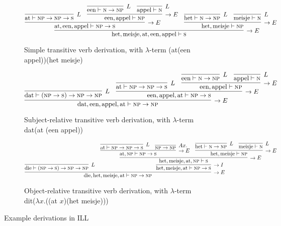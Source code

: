 \begin{figure}
	\begin{subfigure}[b]{1\textwidth}
	\centering
	\small
		\[
		\infer[\rightarrow E]{\text{het}, \text{meisje}, \text{at}, \text{een}, \text{appel} \vdash \textsc{s}}{
			\infer[\rightarrow E]{\text{at}, \text{een}, \text{appel} \vdash \textsc{np} \to \textsc{s}}{
				\infer[L]{\text{at} \vdash \textsc{np} \to \textsc{np} \to \textsc{s}}{}
				&
				\infer[\rightarrow E]{\text{een}, \text{appel} \vdash \textsc{np}}{
					\infer[L]{\text{een} \vdash \textsc{n} \to \textsc{np}}{}
					&
					\infer[L]{\text{appel} \vdash \textsc{n}}{}
				}
			}
			&		
			\infer[\rightarrow E]{\text{het}, \text{meisje} \vdash \textsc{np}}{
				\infer[L]{\text{het} \vdash \textsc{n} \to \textsc{np}}{}
				&
				\infer[L]{\text{meisje} \vdash \textsc{n}}{}
			}
		}
		\]
		\caption{Simple transitive verb derivation, with $\lambda$-term (at(een appel))(het meisje)}
		\end{subfigure}
		\begin{subfigure}[b]{1\textwidth}
		\centering
		\scriptsize
		\[
		\infer[\rightarrow E]{\text{dat}, \text{een}, \text{appel}, \text{at} \vdash \textsc{np} \to \textsc{np}}{
			\infer[L]{\text{dat} \vdash (\textsc{np} \to \textsc{s}) \to \textsc{np} \to \textsc{np}}{}
			&
			\infer[\rightarrow E]{\text{een}, \text{appel}, \text{at} \vdash \textsc{np} \to \textsc{s}}{
				\infer[L]{\text{at} \vdash \textsc{np} \to \textsc{np} \to \textsc{s}}{}
				&
				\infer[\rightarrow E]{\text{een}, \text{appel} \vdash \textsc{np}}{
					\infer[L]{\text{een} \vdash \textsc{n} \to \textsc{np}}{}
					&
					\infer[L]{\text{appel} \vdash \textsc{n}}{}
				}
			}
		}
		\]
		\caption{Subject-relative transitive verb derivation, with $\lambda$-term dat(at (een appel))}
		\label{subfig:ill_dutch:sub}
		\end{subfigure}
		\begin{subfigure}[b]{1\textwidth}
		\centering
		\scriptsize
		\[
		\infer[\rightarrow E]{\text{die}, \text{het}, \text{meisje}, \text{at} \vdash \textsc{np} \to \textsc{np}}{
			\infer[L]{\text{die} \vdash (\textsc{np} \to \textsc{s})\to \textsc{np} \to \textsc{np}}{}
			&
			\infer[\rightarrow I]{\text{het}, \text{meisje}, \text{at} \vdash \textsc{np} \to \textsc{s}}{
				\infer[\rightarrow E]{\text{het}, \text{meisje}, \text{at}, \textsc{np} \vdash \textsc{s}}{
					\infer[\rightarrow E]{\text{at}, \textsc{np}\vdash \textsc{np} \to \textsc{s}}{
						\infer[L]{\text{at} \vdash \textsc{np} \to \textsc{np} \to \textsc{s}}{}
						&
						\infer[Ax.]{\textsc{np} \to \textsc{np}}{}
					}
					&
					\infer[\rightarrow E]{\text{het}, \text{meisje} \vdash \textsc{np}}{
						\infer[L]{\text{het} \vdash \textsc{n} \to \textsc{np}}{}
						&
						\infer[L]{\text{meisje} \vdash \textsc{n}}{}					
					}
				}
			}
		}
		\]
		\caption{Object-relative transitive verb derivation, with $\lambda$-term dit($\lambda x$.((at $x$)(het meisje)))}
		\label{subfig:ill_dutch:obj}
		\end{subfigure}
\caption[Example ILL Derivations]{Example derivations in ILL}
\label{fig:ill_dutch}
\end{figure}

